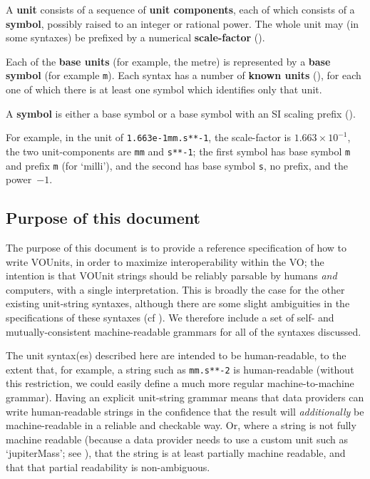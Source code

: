 \documentclass[11pt,a4paper]{ivoa}
\newcommand{\unit}[1]{\texttt{\small\color{orange}#1}}
\begin{document}
A \textbf{unit} consists of a sequence of \textbf{unit components},
each of which consists of a \textbf{symbol}, possibly raised
to an integer or rational power.  The whole unit may (in some
syntaxes) be prefixed by a numerical \textbf{scale-factor} ().

Each of the \textbf{base units} (for example, the metre) is
represented by a \textbf{base symbol} (for example \unit{m}).  Each
syntax has a number of \textbf{known units}
(), for each one of which there is at least
one symbol which identifies only that unit.

A \textbf{symbol} is either a base symbol or a base symbol with an SI
scaling prefix ().

For example, in the unit of \unit{1.663e-1mm.s**-1}, the scale-factor
is $1.663\times10^{-1}$, the two unit-components are \texttt{mm}
and \texttt{s**-1}; the first symbol has base symbol \texttt{m} and
prefix \texttt{m} (for `milli'), and the second has base
symbol \texttt{s}, no prefix, and the power~$-1$.



\subsection{Purpose of this document}
\label{sec:purpose}

The purpose of this document is to provide a reference specification of how
to write VOUnits, in order to maximize interoperability within the VO;
the intention is that VOUnit strings should be reliably
parsable by humans \emph{and} computers, with a single interpretation.
This is broadly the case for the other existing
unit-string syntaxes, although there are some slight ambiguities in
the specifications of these syntaxes (cf ).
We therefore include a set of self- and mutually-consistent
machine-readable grammars for all of the syntaxes discussed.

The unit syntax(es) described here are intended to be human-readable,
to the extent that, for example, a string such as \unit{mm.s**-2} is
human-readable (without this restriction, we could easily define a
much more regular machine-to-machine grammar).  Having an explicit
unit-string grammar means that data providers can write human-readable
strings in the confidence that the result will \emph{additionally} be
machine-readable in a reliable and checkable way.  Or, where a string
is not fully machine readable (because a data provider needs to use a
custom unit such as `jupiterMass'; see ), that the
string is at least partially machine readable, and that that partial
readability is non-ambiguous.
\end{document}
